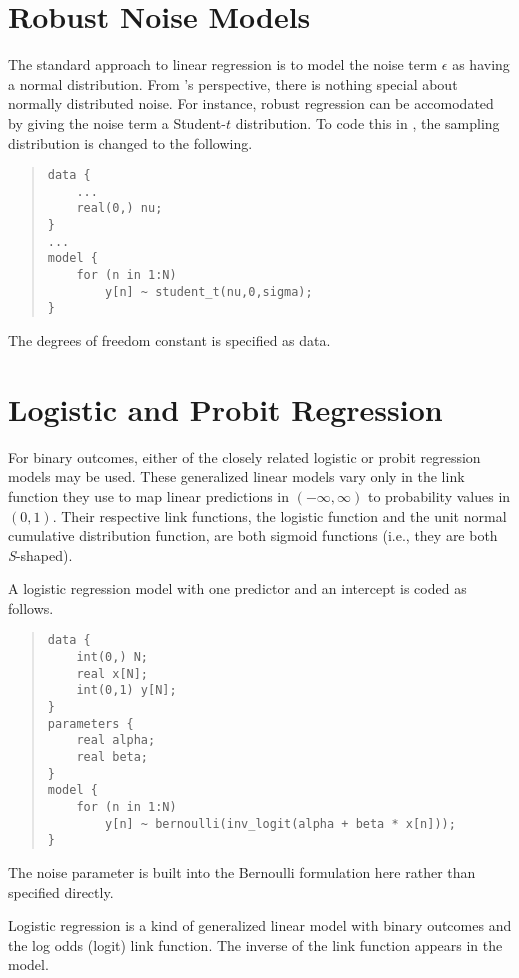 \section{Robust Noise Models}

The standard approach to linear regression is to model the noise
term $\epsilon$ as having a normal distribution.  From \Stan's
perspective, there is nothing special about normally distributed
noise.  For instance, robust regression can be accomodated by giving
the noise term a Student-$t$ distribution.  To code this in \Stan, the
sampling distribution is changed to the following.
%
\begin{quote}
\begin{Verbatim}
data {
    ...
    real(0,) nu;
}
...
model {
    for (n in 1:N)
        y[n] ~ student_t(nu,0,sigma);
}
\end{Verbatim}
\end{quote}
%
The degrees of freedom constant  is specified as data.

\section{Logistic and Probit Regression}\label{logistic-probit-regression.section}

For binary outcomes, either of the closely related logistic or probit
regression models may be used.  These generalized linear models vary
only in the link function they use to map linear predictions in
$(-\infty,\infty)$ to probability values in $(0,1)$.  Their respective
link functions, the logistic function and the unit normal cumulative distribution
function, are both sigmoid functions (i.e., they are both {\it S}-shaped).

A logistic regression model with one predictor and an intercept is coded as
follows.
%
\begin{quote}
\begin{Verbatim}
data {
    int(0,) N;
    real x[N];
    int(0,1) y[N];
}
parameters {
    real alpha;
    real beta;
}
model {
    for (n in 1:N)
        y[n] ~ bernoulli(inv_logit(alpha + beta * x[n]));
} 
\end{Verbatim}
\end{quote}
%
The noise parameter is built into the Bernoulli formulation here
rather than specified directly.

Logistic regression is a kind of generalized linear model with binary
outcomes and the log odds (logit) link function.  The inverse of the
link function appears in the model.  

